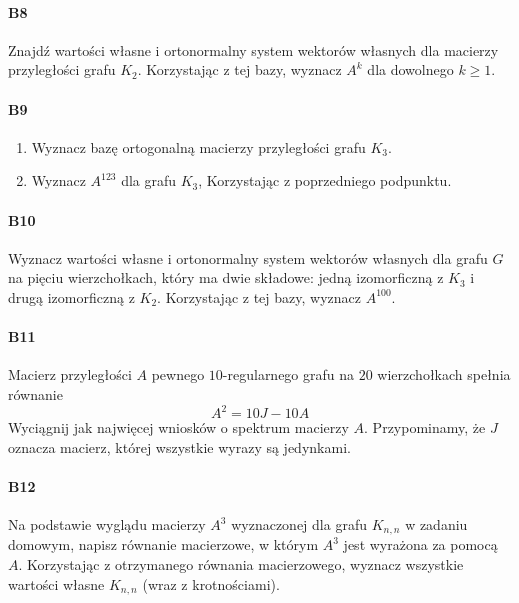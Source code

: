 \paragraph{B8} Znajdź wartości własne i ortonormalny system wektorów własnych dla macierzy przyległości grafu $K_2$. Korzystając z tej bazy, wyznacz $A^k$ dla dowolnego $k \geq 1$.

\paragraph{B9}
\begin{enumerate}[label=\alph*)]
\item Wyznacz bazę ortogonalną macierzy przyległości grafu $K_3$.
\item Wyznacz $A^{123}$ dla grafu $K_3$, Korzystając z poprzedniego podpunktu.
\end{enumerate}

\paragraph{B10} Wyznacz wartości własne i ortonormalny system wektorów własnych dla grafu $G$ na pięciu wierzchołkach, który ma dwie składowe: jedną izomorficzną z $K_3$ i drugą izomorficzną z $K_2$. Korzystając z tej bazy, wyznacz $A^{100}$.

\paragraph{B11} Macierz przyległości $A$ pewnego $10$-regularnego grafu na $20$ wierzchołkach spełnia równanie $$A^2 = 10J - 10A$$ Wyciągnij jak najwięcej wniosków o spektrum macierzy $A$. Przypominamy, że $J$ oznacza macierz, której wszystkie wyrazy są jedynkami.

\paragraph{B12} Na podstawie wyglądu macierzy $A^3$ wyznaczonej dla grafu $K_{n,n}$ w zadaniu domowym, napisz równanie macierzowe, w którym $A^3$ jest wyrażona za pomocą $A$. Korzystając z otrzymanego równania macierzowego, wyznacz wszystkie wartości własne $K_{n,n}$ (wraz z krotnościami).

